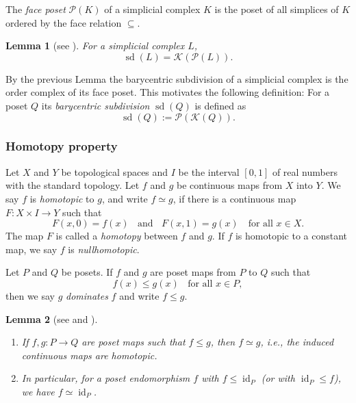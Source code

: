 \documentclass[a4paper,11pt]{article}
\newtheorem{lemma}[lemma]{Lemma}
\theoremstyle{definition}
\theoremstyle{remark}
\DeclareMathOperator{\sd}{sd}
\DeclareMathOperator{\id}{id}
\begin{document}
The \emph{face poset} $\mathcal{P}(K)$ of a simplicial complex $K$ is the poset of all simplices of $K$ ordered by the face relation $\subseteq$.

\begin{lemma}[see {\cite[Lemma~1.6.7]{Smi11}}]
  For a simplicial complex $L$, $$\sd(L)=\mathcal{K}(\mathcal{P}(L)).$$
\end{lemma}

By the previous Lemma the barycentric subdivision of a simplicial complex is the order complex of its face poset. This motivates the following definition: For a poset $Q$ its \emph{barycentric subdivision} $\sd(Q)$ is defined as $$\sd(Q):=\mathcal{P}(\mathcal{K}(Q)).$$ 

\subsubsection*{Homotopy property}

Let $X$ and $Y$ be topological spaces and $I$ be the interval $[0,1]$ of real numbers with the standard topology. Let $f$ and $g$ be continuous maps from $X$ into $Y$. We say $f$ is \emph{homotopic} to $g$, and write $f\simeq g$, if there is a continuous map $F\colon X\times I\to Y$ such that $$ F(x,0) = f(x)\;\; \text{ and }\;\; F(x,1) = g(x)\quad \text{for all } x\in X. $$
The map $F$ is called a \emph{homotopy} between $f$ and $g$. If $f$ is homotopic to a constant map,  we say $f$ is \emph{nullhomotopic}.

Let $P$ and $Q$ be posets. If $f$ and $g$ are poset maps from $P$ to $Q$ such that $$ f(x)\leq g(x) \;\;\text{ for all } x\in P, $$ then we say $g$ \emph{dominates} $f$ and write $f\leq g$.

\begin{lemma}[see {\cite[1.3~Homotopy~property]{Qui78}} and {\cite[Lemma~3.1.7]{Smi11}}]
  \mbox{}\\[-3ex]
  \begin{enumerate}
  \item If $f,g\colon P\to Q$ are poset maps such that $f\leq g$, then $f\simeq g$, i.e., the induced continuous maps are homotopic.
  \item In particular, for a poset endomorphism $f$ with $f\leq \id_{P}$ (or with $\id_{P}\leq f$), we have $f\simeq \id_{P}$. 
  \end{enumerate}
\end{lemma}
 
\end{document}
